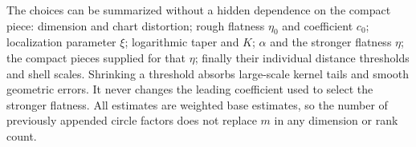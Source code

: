 \begin{remark}\label{local:choice-order}
The choices can be summarized without a hidden dependence on the
compact piece: dimension and chart distortion; rough flatness
$\eta_0$ and coefficient $c_0$; localization parameter $\xi$;
logarithmic taper and $K$; $\alpha$ and the stronger flatness $\eta$;
the compact pieces supplied for that $\eta$; finally their individual
distance thresholds and shell scales.  Shrinking a threshold absorbs
large-scale kernel tails and smooth geometric errors.  It never
changes the leading coefficient used to select the stronger
flatness.  All estimates are weighted base estimates, so the number
of previously appended circle factors does not replace $m$ in any
dimension or rank count.
\end{remark}
